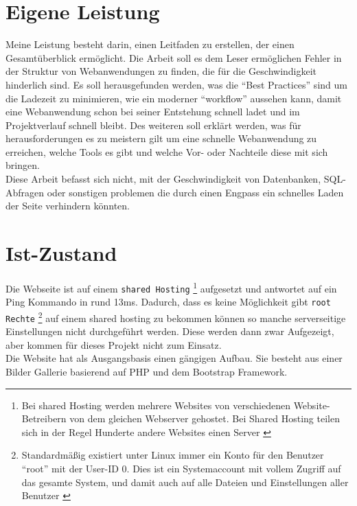 
\section{Eigene Leistung} %
\label{sub:eigene_leistung}
	Meine Leistung besteht darin, einen Leitfaden zu erstellen, der einen Gesamtüberblick ermöglicht. Die Arbeit soll es dem Leser ermöglichen Fehler in der Struktur von Webanwendungen zu finden, die für die Geschwindigkeit hinderlich sind.
	Es soll herausgefunden werden, was die "`Best Practices"' sind um die Ladezeit zu minimieren, wie ein moderner "`workflow"' aussehen kann, damit eine Webanwendung schon bei seiner Entstehung schnell ladet und im Projektverlauf schnell bleibt. Des weiteren soll erklärt werden, was für herausforderungen es zu meistern gilt um eine schnelle Webanwendung zu erreichen, welche Tools es gibt und welche Vor- oder Nachteile diese mit sich bringen.\\
	Diese Arbeit befasst sich nicht, mit der Geschwindigkeit von Datenbanken, SQL-Abfragen oder sonstigen problemen die durch einen Engpass ein schnelles Laden der Seite verhindern könnten.



\section{Ist-Zustand} %
\label{sec:Ist-Zustand}
	Die Webseite ist auf einem \texttt{shared Hosting}
	\footnote{Bei shared Hosting werden mehrere Websites von verschiedenen Website-Betreibern von dem gleichen Webserver gehostet. Bei Shared Hosting teilen sich in der Regel Hunderte andere Websites einen Server \autocite{itWissen}} 
	aufgesetzt und antwortet auf ein Ping Kommando in rund 13ms. Dadurch, dass es keine Möglichkeit gibt \texttt{root Rechte} \footnote{Standardmäßig existiert unter Linux immer ein Konto für den Benutzer "`root"' mit der User-ID 0. Dies ist ein Systemaccount mit vollem Zugriff auf das gesamte System, und damit auch auf alle Dateien und Einstellungen aller Benutzer \autocite{ubuntu14}} auf einem shared hosting zu bekommen können so manche serverseitige Einstellungen nicht durchgeführt werden. Diese werden dann zwar Aufgezeigt, aber kommen für dieses Projekt nicht zum Einsatz.\\
	Die Website hat als Ausgangsbasis einen gängigen Aufbau. Sie besteht aus einer Bilder Gallerie basierend auf PHP und dem Bootstrap Framework.
